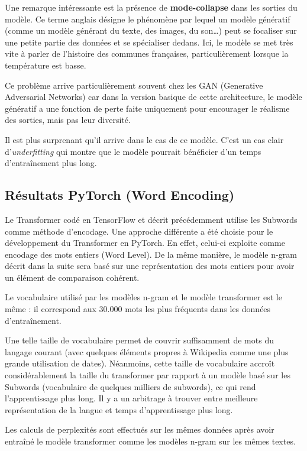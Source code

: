 Une remarque intéressante est la présence de \textbf{mode-collapse} dans
les sorties du modèle. Ce terme anglais désigne le phénomène par lequel
un modèle génératif (comme un modèle générant du texte, des images, du
son\ldots{}) peut se focaliser sur une petite partie des données et se
spécialiser dedans. Ici, le modèle se met très vite à parler de
l'histoire des communes françaises, particulièrement lorsque la
température est basse.

Ce problème arrive particulièrement souvent chez les GAN (Generative
Adversarial Networks) car dans la version basique de cette architecture,
le modèle génératif a une fonction de perte faite uniquement pour
encourager le réalisme des sorties, mais pas leur diversité.

Il est plus surprenant qu'il arrive dans le cas de ce modèle. C'est un
cas clair d'\emph{underfitting} qui montre que le modèle pourrait
bénéficier d'un temps d'entraînement plus long.

\hypertarget{ruxe9sultatspytorch}{%
\subsection{Résultats PyTorch (Word Encoding)}\label{ruxe9sultats}}

Le Transformer codé en TensorFlow et décrit précédemment utilise les Subwords comme méthode d’encodage. Une approche différente a été choisie pour le développement du Transformer en PyTorch. En effet, celui-ci exploite comme encodage des mots entiers (Word Level). De la même manière, le modèle n-gram décrit dans la suite sera basé sur une représentation des mots entiers pour avoir un élément de comparaison cohérent.

Le vocabulaire utilisé par les modèles n-gram et le modèle transformer est le même : il correspond aux 30.000 mots les plus fréquents dans les données d'entraînement.

Une telle taille de vocabulaire permet de couvrir suffisamment de mots du langage courant (avec quelques éléments propres à Wikipedia comme une plus grande utilisation de dates). Néanmoins, cette taille de vocabulaire accroît considérablement la taille du transformer par rapport à un modèle basé sur les Subwords (vocabulaire de quelques milliers de subwords), ce qui rend l’apprentissage plus long. Il y a un arbitrage à trouver entre meilleure représentation de la langue et temps d’apprentissage plus long.

Les calculs de perplexités sont effectués sur les mêmes données après avoir entraîné le modèle transformer comme les modèles n-gram sur les mêmes textes.

